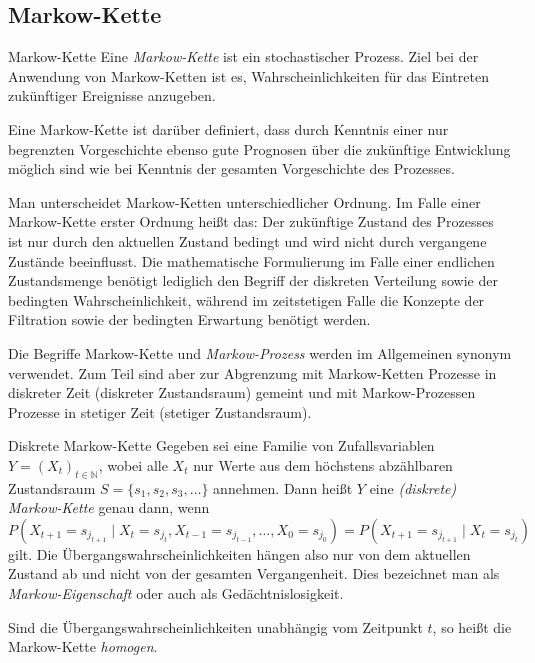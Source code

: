\subsection{Markow-Kette}

\begin{defi}{Markow-Kette}
    Eine \emph{Markow-Kette} ist ein stochastischer Prozess.
    Ziel bei der Anwendung von Markow-Ketten ist es, Wahrscheinlichkeiten für das Eintreten zukünftiger Ereignisse anzugeben.

    Eine Markow-Kette ist darüber definiert, dass durch Kenntnis einer nur begrenzten Vorgeschichte ebenso gute Prognosen über die zukünftige Entwicklung möglich sind wie bei Kenntnis der gesamten Vorgeschichte des Prozesses.

    Man unterscheidet Markow-Ketten unterschiedlicher Ordnung.
    Im Falle einer Markow-Kette erster Ordnung heißt das:
    Der zukünftige Zustand des Prozesses ist nur durch den aktuellen Zustand bedingt und wird nicht durch vergangene Zustände beeinflusst.
    Die mathematische Formulierung im Falle einer endlichen Zustandsmenge benötigt lediglich den Begriff der diskreten Verteilung sowie der bedingten Wahrscheinlichkeit, während im zeitstetigen Falle die Konzepte der Filtration sowie der bedingten Erwartung benötigt werden.

    Die Begriffe Markow-Kette und \emph{Markow-Prozess} werden im Allgemeinen synonym verwendet.
    Zum Teil sind aber zur Abgrenzung mit Markow-Ketten Prozesse in diskreter Zeit (diskreter Zustandsraum) gemeint und mit Markow-Prozessen Prozesse in stetiger Zeit (stetiger Zustandsraum).
\end{defi}

\begin{defi}{Diskrete Markow-Kette}
    Gegeben sei eine Familie von Zufallsvariablen $Y = (X_{t})_{t\in \mathbb{N}}$, wobei alle $X_{t}$ nur Werte aus dem höchstens abzählbaren Zustandsraum $S = \{s_{1},s_{2},s_{3},\dots \}$ annehmen.
    Dann heißt $Y$ eine \emph{(diskrete) Markow-Kette} genau dann, wenn
    \[
        P(X_{t+1} = s_{j_{t+1}} \mid X_{t} = s_{j_{t}}, X_{t-1} = s_{j_{t-1}}, \dots , X_{0} = s_{j_{0}}) = P(X_{t+1} = s_{j_{t+1}} \mid X_{t}=s_{j_{t}})
    \]
    gilt.
    Die Übergangswahrscheinlichkeiten hängen also nur von dem aktuellen Zustand ab und nicht von der gesamten Vergangenheit.
    Dies bezeichnet man als \emph{Markow-Eigenschaft} oder auch als Gedächtnislosigkeit.

    Sind die Übergangswahrscheinlichkeiten unabhängig vom Zeitpunkt $t$, so heißt die Markow-Kette \emph{homogen}.
\end{defi}

